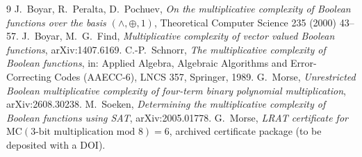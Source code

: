 \documentclass[11pt,a4paper]{article}
\theoremstyle{plain}
\theoremstyle{definition}
\theoremstyle{remark}
\begin{document}
\begin{thebibliography}{9}
 J.~Boyar, R.~Peralta, D.~Pochuev, \emph{On the multiplicative complexity of Boolean functions over the basis $(\wedge,\oplus,1)$}, Theoretical Computer Science 235 (2000) 43--57.
 J.~Boyar, M.~G.~Find, \emph{Multiplicative complexity of vector valued Boolean functions}, arXiv:1407.6169.
 C.-P.~Schnorr, \emph{The multiplicative complexity of Boolean functions}, in: Applied Algebra, Algebraic Algorithms and Error-Correcting Codes (AAECC-6), LNCS 357, Springer, 1989.
 G.~Morse, \emph{Unrestricted Boolean multiplicative complexity of four-term binary polynomial multiplication}, arXiv:2608.30238.
 M.~Soeken, \emph{Determining the multiplicative complexity of Boolean functions using SAT}, arXiv:2005.01778.
 G.~Morse, \emph{LRAT certificate for $\mathrm{MC}(3\text{-bit multiplication mod }8)=6$}, archived certificate package (to be deposited with a DOI).
\end{thebibliography}
\end{document}
